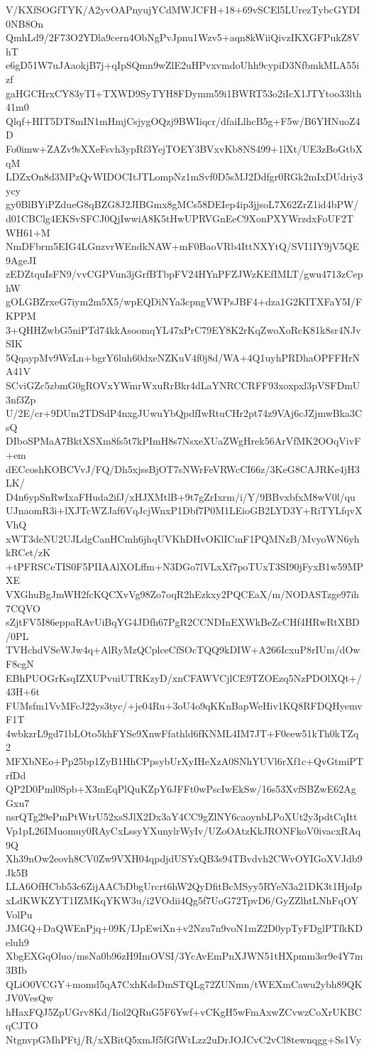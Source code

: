 V/KXfSOGfTYK/A2yvOAPnyujYCdMWJCFH+18+69vSCEl5LUrezTybcGYDI0NB8On
QmhLd9/2F73O2YDla9cern4ObNgPvJpnu1Wzv5+aqn8kWiiQivzIKXGFPukZ8VhT
e6gD51W7uJAaokjB7j+qIpSQmn9wZlE2uHPvxvmdoUhh9cypiD3NfbmkMLA55izf
gaHGCHrxCY83yTI+TXWD9SyTYH8FDymm59i1BWRT53o2iIcX1JTYtoo33lth41m0
Qlqf+HIT5DT8mIN1mHmjCsjygOQzj9BWIiqcr/dfaiLlhcB5g+F5w/B6YHNuoZ4D
Fo0imw+ZAZv9sXXeFsvh3ypRf3YejTOEY3BVxvKb8NS499+1lXt/UE3zBoGtbXqM
LDZxOn8d3MPzQvWIDOCItJTLompNz1mSvf0D5sMJ2Ddfgr0RGk2mIxDUdriy3ycy
gy0BlBYiPZdueG8qBZG8J2JIBGmx8gMCs58DEIep4ip3jjsoL7X62ZrZ1id4bPW/
d01CBClg4EKSvSFCJ0QjIwwiA8K5tHwUPRVGnEeC9XonPXYWrzdxFoUF2TWH61+M
NmDFbrm5EIG4LGnzvrWEndkNAW+mF0BaoVRb4IttNXYtQ/SVI1IY9jV5QE9AgeJI
zEDZtquIsFN9/vvCGPVun3jGrfBTbpFV24HYnPFZJWzKEfIMLT/gwu4713zCephW
gOLGBZrxeG7iym2m5X5/wpEQDiNYa3cpngVWPsJBF4+dza1G2KITXFaY5I/FKPPM
3+QHHZwbG5niPTd74kkAsoomqYL47xPrC79EY8K2rKqZwoXoRcK81k8sr4NJvSIK
5QqaypMv9WzLn+bgrY6luh60dxeNZKuV4f0j8d/WA+4Q1uyhPRDhaOPFFHrNA41V
SCviGZc5zbmG0gROVxYWmrWxuRrBkr4dLaYNRCCRFF93xoxpxl3pVSFDmU3nf3Zp
U/2E/cr+9DUm2TDSdP4nxgJUwuYbQpdfIwRtuCHr2pt74z9VAj6cJZjmwBka3CsQ
DIboSPMaA7BktXSXm8fs5t7kPImH8s7NsxeXUaZWgHrek56ArVfMK2OOqVivF+em
dECcoshKOBCVvJ/FQ/Dh5xjssBjOT7sNWrFeVRWcCI66z/3KeG8CAJRKe4jH3LK/
D4n6ypSnRwIxaFHuda2ifJ/xHJXMtlB+9t7gZrIxrm/i/Y/9BBvxbfxM8wV0l/qu
UJnaomR3i+lXJTcWZJaf6VqJcjWnxP1Dbf7P0M1LEioGB2LYD3Y+RiTYLfqvXVhQ
xWT3deNU2UJLdgCanHCmh6jhqUVKhDHvOKlICmF1PQMNzB/MvyoWN6yhkRCet/zK
+tPFRSCeTIS0F5PIIAAlXOLffm+N3DGo7lVLxXf7poTUxT3SI90jFyxB1w59MPXE
VXGhuBgJmWH2fcKQCXvVg98Zo7oqR2hEzkxy2PQCEaX/m/NODASTzge97ih7CQVO
sZjtFV5I86eppaRAvUiBqYG4JDfh67PgR2CCNDInEXWkBeZcCHf4HRwRtXBD/0PL
TVHchdVSeWJw4q+AlRyMzQCplceCfSOcTQQ9kDIW+A266IcxuP8rIUm/dOwF8cgN
EBhPUOGrKsqIZXUPvuiUTRKzyD/xnCFAWVCjlCE9TZOEzq5NzPDOlXQt+/43H+6t
FUMsfm1VvMFcJ22ys3tyc/+je04Ru+3oU4o9qKKnBapWeHiv1KQ8RFDQHyemvF1T
4wbkzrL9gd71bLOto5khFYSe9XnwFfathld6fKNML4IM7JT+F0eew51kTh0kTZq2
MFXbNEo+Pp25bp1ZyB1HhCPpsybUrXyIHeXzA0SNhYUVl6rXf1c+QvGtmiPTrfDd
QP2D0Pml0Spb+X3mEqPlQuKZpY6JFFt0wPscIwEkSw/16s53XvfSBZwE62AgGxu7
nsrQTg29ePmPtWtrU52xsSJlX2Dx3aY4CC9gZlNY6caoynbLPoXUt2y3pdtCqItt
Vp1pL26IMuomuy0RAyCxLssyYXunylrWyIv/UZoOAtzKkJRONFkoV0ivacxRAq9Q
Xh39nOw2eovh8CV0Zw9VXH04qpdjdUSYxQB3s94TBvdvh2CWvOYIGoXVJdb9Jk5B
LLA6OfHCbb53c6ZijAACbDbgUrcrt6hW2QyDfitBcMSyy5RYeN3a21DK3t1HjoIp
xLdKWKZYT1IZMKqYKW3u/i2VOdii4Qg5f7UoG72TpvD6/GyZZlhtLNhFqOYVolPu
JMGQ+DaQWEnPjq+09K/IJpEwiXn+v2Nzu7n9voN1mZ2D0ypTyFDglPTfkKDeluh9
XbgEXGqOluo/msNa0b96zH9ImOVSI/3YcAvEmPnXJWN51tHXpmm3sr9e4Y7m3BIb
QLiO0VCGY+momd5qA7CxhKdsDmSTQLg72ZUNmn/tWEXmCawu2ybh89QKJV0VesQw
hHaxFQJ5ZpUGrv8Kd/Iiol2QRuG5F6Ywf+vCKgH5wFmAxwZCvwzCoXrUKBCqCJTO
NtgnvpGMhPFtj/R/xXBitQ5xmJf5fGfWtLzz2uDrJOJCvC2vCl8tewnqgg+Ss1Vy
